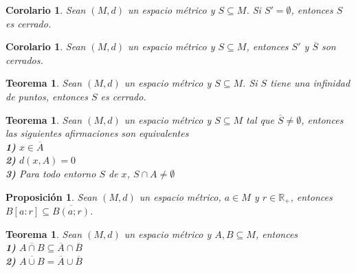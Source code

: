 \documentclass[oneside]{book} %
\theoremstyle{Teorema}
\newtheorem{Teorema}[Definicion]{Teorema}
\newtheorem{Corolario}[Definicion]{Corolario}
\newtheorem{Proposicion}[Definicion]{Proposición}
\theoremstyle{Ejemplos}
\theoremstyle{[Obs]}
\renewcommand{\{}{\left\lbrace} %
\renewcommand{\}}{\right\rbrace} %
\renewcommand{\u}{\cup} %
\newcommand{\n}{\cap} %
\renewcommand{\sc}{\subseteq} %
\newcommand{\R}{\mathbb{R}} %
\begin{document}
			\begin{Corolario}
				
				Sean $(M, d)$ un espacio métrico y $S \sc M$. Si $S' = \emptyset$, entonces $S$ es cerrado. \\

			\end{Corolario}

			\begin{Corolario}
				
				Sean $(M, d)$ un espacio métrico y $S \sc M$, entonces $S'$ y $\overline{S}$ son cerrados. \\

			\end{Corolario}

			\begin{Teorema}
				
				Sean $(M, d)$ un espacio métrico y $S \sc M$. Si $S$ tiene una infinidad de puntos, entonces $S$ es cerrado. \\

			\end{Teorema}

			\begin{Teorema}
				
				Sean $(M, d)$ un espacio métrico y $S \sc M$ tal que $\overline{S} \neq \emptyset$, entonces las siguientes afirmaciones son equivalentes \\

				\textbf{1)} $x \in \overline{A}$ \\

				\textbf{2)} $d(x, A) = 0$ \\

				\textbf{3)} Para todo entorno $S$ de $x$, $S \n A \neq \emptyset$ \\

			\end{Teorema}

			\begin{Proposicion}

				Sean $(M, d)$ un espacio métrico, $a \in M$ y $r \in \R_{+}$, entonces $B[a:r] \sc \overline{B(a;r)}$. \\

			\end{Proposicion}

			\begin{Teorema}
				
				Sean $(M, d)$ un espacio métrico y $A, B \sc M$, entonces \\

				\textbf{1)} $\overline{A \n B} \sc \overline{A} \n \overline{B}$ \\

				\textbf{2)} $\overline{A \u B} = \overline{A} \u \overline{B}$ \\

			\end{Teorema}
\end{document}
